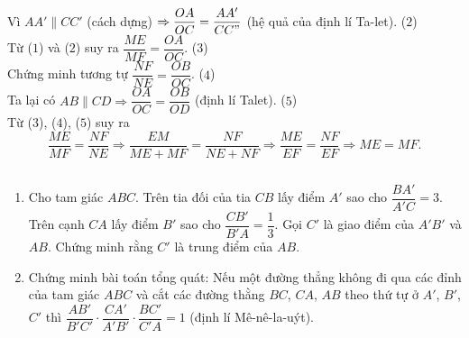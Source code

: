 \begin{bt}
{		Vì $ AA' \parallel CC'$ (cách dựng) $\Rightarrow \dfrac{OA}{OC}=\dfrac{AA'}{CC"} $ (hệ quả của định lí Ta-let). \hfill($ 2 $)\\
		Từ ($ 1 $) và ($ 2 $) suy ra $ \dfrac{ME}{MF}=\dfrac{OA}{OC} $. \hfill($ 3 $)\\
		Chứng minh tương tự $ \dfrac{NF}{NE}=\dfrac{OB}{OC} $. \hfill($ 4 $)\\
		Ta lại có $ AB \parallel CD \Rightarrow \dfrac{OA}{OC}=\dfrac{OB}{OD}$ (định lí Talet). \hfill($ 5 $)\\
		Từ ($ 3 $), ($ 4 $), ($ 5 $) suy ra 
		$$ \dfrac{ME}{MF}=\dfrac{NF}{NE} \Rightarrow \dfrac{EM}{ME+MF}=\dfrac{NF}{NE+NF} \Rightarrow \dfrac{ME}{EF}=\dfrac{NF}{EF} \Rightarrow ME=MF.$$
		
	}
\end{bt}
\begin{bt}%
	$ $
	\begin{enumerate}
		\item Cho tam giác $ ABC $. Trên tia đối của tia $ CB $ lấy điểm $ A' $ sao cho $ \dfrac{BA'}{A'C}=3 $. Trên cạnh $ CA $ lấy điểm $ B' $ sao cho $ \dfrac{CB'}{B'A}=\dfrac{1}{3} $. Gọi $ C' $ là giao điểm của $ A'B' $ và $ AB $. Chứng minh rằng $ C' $ là trung điểm của $ AB $.
		\item Chứng minh bài toán tổng quát: Nếu một đường thẳng không đi qua các đỉnh của tam giác $ ABC $ và cắt các đường thằng $ BC $, $ CA $, $ AB $ theo thứ tự ở $ A' $, $ B' $, $ C' $ thì $ \dfrac{AB'}{B'C'} \cdot \dfrac{CA'}{A'B'} \cdot \dfrac{BC'}{C'A}=1$ (định lí Mê-nê-la-uýt).
	\end{enumerate}
\end{bt}
